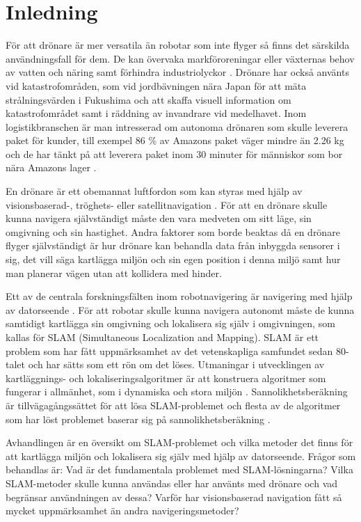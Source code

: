 \chapter{Inledning}

För att drönare är mer versatila än robotar som inte flyger så finns det särskilda användningsfall för dem. De kan övervaka markföroreningar eller växternas behov av vatten och näring samt förhindra industriolyckor \citep{crowdsurveillance}. Drönare har också använts vid katastrofområden, som vid jordbävningen nära Japan för att mäta strålningsvärden i Fukushima och att skaffa visuell information om katastrofområdet samt i räddning av invandrare vid medelhavet. Inom logistikbranschen är man intresserad om autonoma drönaren som skulle leverera paket för kunder, till exempel 86 \% av Amazons paket väger mindre än 2.26 kg och de har tänkt på att leverera paket inom 30 minuter för människor som bor nära Amazons lager \citep{cbsnews}.

En drönare är ett obemannat luftfordon som kan styras med hjälp av visionsbaserad-, tröghets- eller satellitnavigation \citep{geospatial}. För att en drönare skulle kunna navigera självständigt måste den vara medveten om sitt läge, sin omgivning och sin hastighet. Andra faktorer som borde beaktas då en drönare flyger självständigt är hur drönare kan behandla data från inbyggda sensorer i sig, det vill säga kartlägga miljön och sin egen position i denna miljö samt hur man planerar vägen utan att kollidera med hinder.

Ett av de centrala forskningsfälten inom robotnavigering är navigering med hjälp av datorseende \citep{982903}. För att robotar skulle kunna navigera autonomt måste de kunna samtidigt kartlägga sin omgivning och lokalisera sig själv i omgivningen, som kallas för SLAM (Simultaneous Localization and Mapping). SLAM är ett problem som har fått uppmärksamhet av det vetenskapliga samfundet sedan 80-talet och har sätts som ett rön om det löses. Utmaningar i utvecklingen av kartläggnings- och lokaliseringsalgoritmer är att konstruera algoritmer som fungerar i allmänhet, som i dynamiska och stora miljön \citep{realslamproblem}. Sannolikhetsberäkning är tillvägagångssättet för att lösa SLAM-problemet och flesta av de algoritmer som har löst problemet baserar sig på sannolikhetsberäkning \citep{ProbabilisticRobotics}.

Avhandlingen är en översikt om SLAM-problemet och vilka metoder det finns för att kartlägga miljön och lokalisera sig själv med hjälp av datorseende. Frågor som behandlas är: Vad är det fundamentala problemet med SLAM-lösningarna? Vilka SLAM-metoder skulle kunna användas eller har använts med drönare och vad begränsar användningen av dessa? Varför har visionsbaserad navigation fått så mycket uppmärksamhet än andra navigeringsmetoder?

